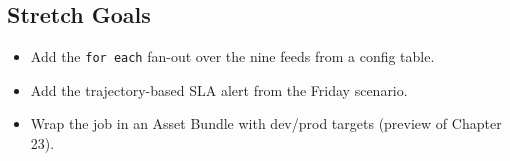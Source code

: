 \subsection*{Stretch Goals}
\begin{itemize}
    \item Add the \texttt{for each} fan-out over the nine feeds from a config table.
    \item Add the trajectory-based SLA alert from the Friday scenario.
    \item Wrap the job in an Asset Bundle with dev/prod targets (preview of Chapter 23).
\end{itemize}
